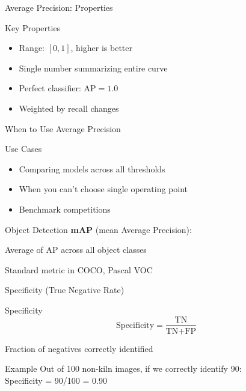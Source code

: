 \documentclass{beamer}
\begin{document}
\begin{frame}{Average Precision: Properties}
\begin{keypointsbox}{Key Properties}
\small
\begin{itemize}
    \item Range: $[0, 1]$, higher is better
    \item Single number summarizing entire curve
    \item Perfect classifier: $\text{AP} = 1.0$
    \item Weighted by recall changes
\end{itemize}
\end{keypointsbox}
\end{frame}

\begin{frame}{When to Use Average Precision}
\begin{keypointsbox}{Use Cases}
\small
\begin{itemize}
    \item Comparing models across all thresholds
    \item When you can't choose single operating point
    \item Benchmark competitions
\end{itemize}
\end{keypointsbox}

\vspace{0.15cm}

\begin{examplebox}{Object Detection}
\small
\textbf{mAP} (mean Average Precision):

\vspace{0.2cm}

Average of AP across all object classes

\vspace{0.2cm}

Standard metric in COCO, Pascal VOC
\end{examplebox}
\end{frame}

\begin{frame}{Specificity (True Negative Rate)}
\begin{definitionbox}{Specificity}
\small
$$\text{Specificity} = \frac{\text{TN}}{\text{TN} + \text{FP}}$$

\vspace{0.15cm}

Fraction of negatives correctly identified
\end{definitionbox}

\vspace{0.2cm}

\begin{examplebox}{Example}
\small
Out of 100 non-kiln images, if we correctly identify 90: \\
Specificity = 90/100 = 0.90
\end{examplebox}
\end{frame}
\end{document}
